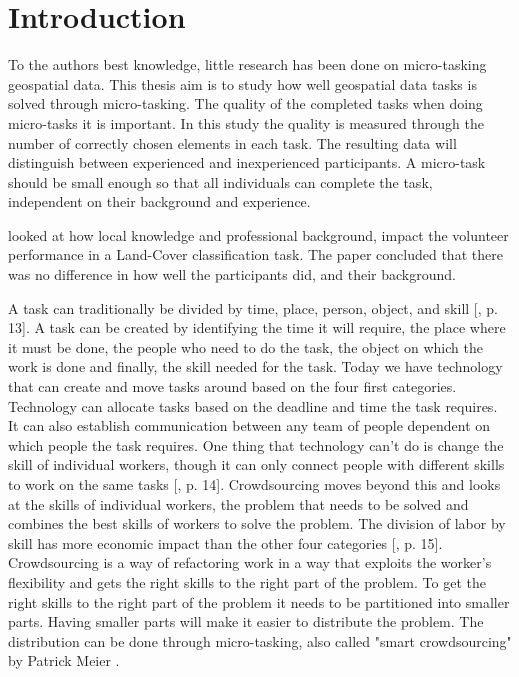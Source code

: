 \chapter{Introduction}

 
 To the authors best knowledge, little research has been done on micro-tasking geospatial data. This thesis aim is to study how well geospatial data tasks is solved through micro-tasking. The quality of the completed tasks when doing micro-tasks it is important. In this study the quality is measured through the number of correctly chosen elements in each task. The resulting data will distinguish between experienced and inexperienced participants. A micro-task should be small enough so that all individuals can complete the task, independent on their background and experience. 
 
 \cite{Salk2016} looked at how local knowledge and professional background, impact the volunteer performance in a Land-Cover classification task. The paper concluded that there was no difference in how well the participants did, and their background. %
 
A task can traditionally be divided by time, place, person, object, and skill [\citep{Meier2013}, p. 13]. A task can be created by identifying the time it will require, the place where it must be done, the people who need to do the task, the object on which the work is done and finally, the skill needed for the task. Today we have technology that can create and move tasks around based on the four first categories.  Technology can allocate tasks based on the deadline and time the task requires. It can also establish communication between any team of people dependent on which people the task requires. One thing that technology can't do is change the skill of individual workers, though it can only connect people with different skills to work on the same tasks [\citep{Meier2013}, p. 14]. Crowdsourcing moves beyond this and looks at the skills of individual workers, the problem that needs to be solved and combines the best skills of workers to solve the problem. The division of labor by skill has more economic impact than the other four categories [\citep{Meier2013}, p. 15]. Crowdsourcing is a way of refactoring work in a way that exploits the worker's flexibility and gets the right skills to the right part of the problem. To get the right skills to the right part of the problem it needs to be partitioned into smaller parts. Having smaller parts will make it easier to distribute the problem. The distribution can be done through micro-tasking, also called "smart crowdsourcing" by Patrick Meier \citep{Meier2013a}. 

